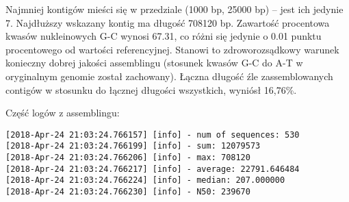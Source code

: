 \documentclass[a4paper]{article}
\begin{document}
Najmniej kontigów mieści się w przedziale (1000 bp, 25000 bp)
-- jest ich jedynie 7. Najdłuższy wskazany kontig ma długość 708120 bp.
Zawartość procentowa kwasów nukleinowych G-C wynosi 67.31,
co różni się jedynie o 0.01 punktu procentowego od wartości referencyjnej.
Stanowi to zdroworozsądkowy warunek konieczny dobrej jakości assemblingu
(stosunek kwasów G-C do A-T w oryginalnym genomie został zachowany).
Łączna długość źle zassemblowanych contigów w stosunku do łącznej długości wszystkich, wyniósł 16,76\%.

Część logów z assemblingu:
\begin{verbatim}
[2018-Apr-24 21:03:24.766157] [info] - num of sequences: 530
[2018-Apr-24 21:03:24.766199] [info] - sum: 12079573
[2018-Apr-24 21:03:24.766206] [info] - max: 708120
[2018-Apr-24 21:03:24.766217] [info] - average: 22791.646484
[2018-Apr-24 21:03:24.766224] [info] - median: 207.000000
[2018-Apr-24 21:03:24.766230] [info] - N50: 239670
\end{verbatim}
\end{document}
